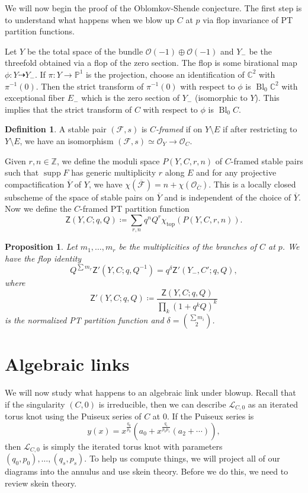 \documentclass{amsart}
\newtheorem{prop}[thm]{Proposition}
\theoremstyle{definition}
\newtheorem{defn}[thm]{Definition}
\theoremstyle{remark}
\theoremstyle{plain}
\theoremstyle{definition}
\theoremstyle{remark}
\newcommand{\C}{\mathbb{C}}
\newcommand{\Z}{\mathbb{Z}}
\renewcommand{\P}{\mathbb{P}}
\newcommand{\mc}[1]{\mathcal{#1}}
\newcommand{\mr}[1]{\mathrm{#1}}
\newcommand{\ms}[1]{\mathsf{#1}}
\newcommand{\ol}[1]{\overline{#1}}
\newcommand{\1}{\mathbf{1}}
\newcommand{\2}{\mathbf{2}}
\newcommand{\3}{\mathbf{3}}
\DeclareMathOperator{\supp}{supp}
\DeclareMathOperator{\Bl}{Bl}
\begin{document}
We will now begin the proof of the Oblomkov-Shende conjecture. The first step is to understand what happens when we blow up $C$ at $p$ via flop invariance of PT partition functions.

Let $Y$ be the total space of the bundle $\mc{O}(-1) \oplus \mc{O}(-1)$ and $Y_-$ be the threefold obtained via a flop of the zero section. The flop is some birational map $\phi \colon Y \dashrightarrow Y_-$. If $\pi \colon Y \to \P^1$ is the projection, choose an identification of $\C^2$ with $\pi^{-1}(0)$. Then the strict transform of $\pi^{-1}(0)$ with respect to $\phi$ is $\Bl_{0} \C^2$ with exceptional fiber $E_-$ which is the zero section of $Y_-$ (isomorphic to $Y$). This implies that the strict transform of $C$ with respect to $\phi$ is $\Bl_0 C$.

\begin{defn}
    A stable pair $(\mc{F}, s)$ is \textit{$C$-framed} if on $Y \setminus E$ if after restricting to $Y \setminus E$, we have an isomorphism $(\mc{F}, s) \simeq \mc{O}_Y \to \mc{O}_C$.
\end{defn}

Given $r, n \in \Z$, we define the moduli space $P(Y, C, r, n)$ of $C$-framed stable pairs such that $\supp F$ has generic multiplicity $r$ along $E$ and for any projective compactification $\ol{Y}$ of $Y$, we have $\chi(\ol{\mc{F}}) = n + \chi(\mc{O}_{\ol{C}})$. This is a locally closed subscheme of the space of stable pairs on $\ol{Y}$ and is independent of the choice of $\ol{Y}$. Now we define the $C$-framed PT partition function
\[ \ms{Z}(Y, C; q, Q) \coloneqq \sum_{r,n} q^n Q^r \chi_{\mr{top}}(P(Y,C,r,n)). \]

\begin{prop}
    Let $m_1, \ldots, m_r$ be the multiplicities of the branches of $C$ at $p$. We have the flop identity
    \[Q^{\sum m_r} \ms{Z}'(Y, C; q, Q^{-1}) = q^{\delta} \ms{Z}'(Y_-, C'; q,Q), \]
    where 
    \[ \ms{Z}'(Y,C; q,Q) \coloneqq \frac{\ms{Z}(Y,C; q,Q)}{\prod_k {(1+q^k Q)}^k} \]
    is the normalized PT partition function and $\delta = \binom{\sum m_i}{2}$.
\end{prop}

\section{Algebraic links}%
\label{sec:algebraic_links}

We will now study what happens to an algebraic link under blowup. Recall that if the singularity $(C, 0)$ is irreducible, then we can describe $\mc{L}_{C,0}$ as an iterated torus knot using the Puiseux series of $C$ at $0$. If the Puiseux series is
\[ y(x) = x^{\frac{q_0}{p_0}} (a_0 + x^{\frac{q_1}{p_0 p_1}} (a_2 + \cdots)), \]
then $\mc{L}_{C,0}$ is simply the iterated torus knot with parameters $(q_0, p_0), \ldots, (q_s, p_s)$. To help us compute things, we will project all of our diagrams into the annulus and use skein theory. Before we do this, we need to review skein theory.
\end{document}
